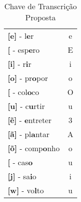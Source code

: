 \begin{table}[H]
\begin{center}
\begin{tabular}{lc}
\textbf{{[}e{]}} - l\textbf{e}r & e \\
\textbf{{[}\textepsilon{]}} - esp\textbf{e}ro & E \\
\textbf{{[}i{]}} - r\textbf{i}r & i \\
\textbf{{[}o{]}} - pr\textbf{o}por & o \\
\textbf{{[}\textopeno{]} }- col\textbf{o}co & O \\
\textbf{{[}u{]}} - c\textbf{u}rtir & u \\
\textbf{{[}\~e{]}} - \textbf{e}ntreter & 3 \\
\textbf{{[}ã{]}} - pl\textbf{a}ntar & A \\
\textbf{{[}\~o{]}} - comp\textbf{o}nho & o \\
\textbf{{[}\textupsilon{]}} - cas\textbf{o} & u \\
\textbf{{[}j{]}} - sa\textbf{i}o & i \\
\textbf{{[}w{]}} - vo\textbf{l}to & u
\end{tabular}
\end{center}
\caption{Chave de Transcrição Proposta}
\label{tab:chave}
\end{table}





